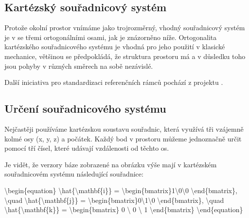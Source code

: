 \documentclass[letterpaper,10pt,english]{jupyterBook}
\begin{document}
\subsection{Kartézský souřadnicový systém}
\label{\detokenize{Prednasky/0_3_Sou_u0159adnicov_xe9_syst_xe9my:kartezsky-souradnicovy-system}}
\sphinxAtStartPar
Protože okolní prostor vnímáme jako trojrozměrný, vhodný souřadnicový systém je  v  se třemi ortogonálními osami, jak je znázorněno níže. Ortogonalita kartézského souřadnicového systému je vhodná pro jeho použití v klasické mechanice, většinou se předpokládá, že struktura prostoru má  a v důsledku toho jsou pohyby v různých směrech na sobě nezávislé.



\sphinxAtStartPar
Další iniciativa pro standardizaci referenčních rámců pochází z projektu .


\subsection{Určení souřadnicového systému}
\label{\detokenize{Prednasky/0_3_Sou_u0159adnicov_xe9_syst_xe9my:urceni-souradnicoveho-systemu}}
\sphinxAtStartPar
Nejčastěji používáme kartézskou soustavu souřadnic, která využívá tři vzájemně kolmé osy (x, y, z) a počátek. Každý bod v prostoru můžeme jednoznačně určit pomocí tří čísel, které udávají vzdálenosti od těchto os.



\sphinxAtStartPar
Je vidět, že verzory báze zobrazené na obrázku výše mají v kartézském souřadnicovém systému následující souřadnice:


\textbackslash{}begin\{equation\}
\textbackslash{}hat\{\textbackslash{}mathbf\{i\}\} = \textbackslash{}begin\{bmatrix\}1\textbackslash{}0\textbackslash{}0 \textbackslash{}end\{bmatrix\}, \textbackslash{}quad \textbackslash{}hat\{\textbackslash{}mathbf\{j\}\} = \textbackslash{}begin\{bmatrix\}0\textbackslash{}1\textbackslash{}0 \textbackslash{}end\{bmatrix\}, \textbackslash{}quad \textbackslash{}hat\{\textbackslash{}mathbf\{k\}\} = \textbackslash{}begin\{bmatrix\} 0 \textbackslash{} 0 \textbackslash{} 1 \textbackslash{}end\{bmatrix\}
\textbackslash{}end\{equation\}
\end{document}
